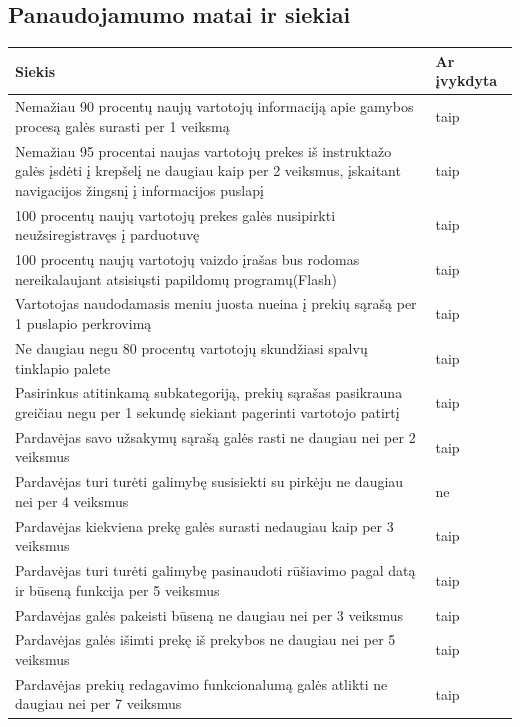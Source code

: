 \documentclass[oneside]{VUMIFPSkursinis}
\begin{document}
\subsection{Panaudojamumo matai ir siekiai}
\begin{center}
    \begin{tabular}{ |p{12cm}| p{3cm} |}
    \hline
	Siekis &Ar įvykdyta \\ \hline
	Nemažiau 90 procentų naujų vartotojų informaciją apie gamybos procesą galės surasti per 1 veiksmą& taip \\ \hline
	Nemažiau 95 procentai naujas vartotojų prekes iš instruktažo galės įsdėti į krepšelį ne daugiau kaip per 2 veiksmus, įskaitant navigacijos žingsnį į informacijos puslapį& taip \\ \hline
	100 procentų naujų vartotojų prekes galės nusipirkti neužsiregistravęs į parduotuvę& taip \\ \hline
	100 procentų naujų vartotojų vaizdo įrašas bus rodomas nereikalaujant atsisiųsti papildomų programų(Flash) & taip \\ \hline
	Vartotojas naudodamasis meniu juosta nueina į prekių sąrašą per 1 puslapio perkrovimą & taip \\ \hline
	Ne daugiau negu 80 procentų vartotojų skundžiasi spalvų tinklapio palete & taip \\ \hline
	Pasirinkus atitinkamą subkategoriją, prekių sąrašas pasikrauna greičiau negu per 1 sekundę siekiant pagerinti vartotojo patirtį & taip \\ \hline
	Pardavėjas savo užsakymų sąrašą galės rasti ne daugiau nei per 2 veiksmus & taip \\ \hline
	Pardavėjas turi turėti galimybę susisiekti su pirkėju ne daugiau nei per 4 veiksmus & ne \\ \hline
	Pardavėjas kiekviena prekę galės surasti nedaugiau kaip per 3 veiksmus & taip \\ \hline
	Pardavėjas turi turėti galimybę pasinaudoti rūšiavimo pagal datą ir būseną funkcija per 5 veiksmus & taip \\ \hline
	Pardavėjas galės pakeisti būseną ne daugiau nei per 3 veiksmus & taip \\ \hline
	Pardavėjas galės išimti prekę iš prekybos ne daugiau nei per 5 veiksmus & taip \\ \hline
	Pardavėjas prekių redagavimo funkcionalumą galės atlikti ne daugiau nei per 7 veiksmus & taip \\ \hline
	
	
    \end{tabular}
\end{center}
		
\end{document}
